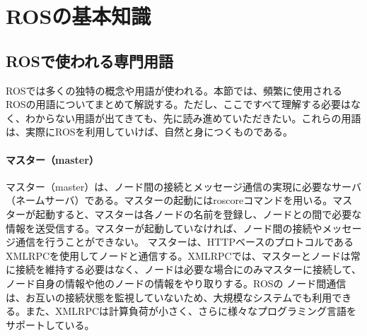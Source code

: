 
\chapter{ROSの基本知識}

\section{ROSで使われる専門用語}

ROSでは多くの独特の概念や用語が使われる。本節では、頻繁に使用されるROSの用語についてまとめて解説する。ただし、ここですべて理解する必要はなく、わからない用語が出てきても、先に読み進めていただきたい。これらの用語は、実際にROSを利用していけば、自然と身につくものである。

\subsubsection{マスター（master）}
マスター（master）は、ノード間の接続とメッセージ通信の実現に必要なサーバ（ネームサーバ）である。マスターの起動にはroscoreコマンドを用いる。マスターが起動すると、マスターは各ノードの名前を登録し、ノードとの間で必要な情報を送受信する。マスターが起動していなければ、ノード間の接続やメッセージ通信を行うことができない。
マスターは、HTTPベースのプロトコルであるXMLRPCを使用してノードと通信する。XMLRPCでは、マスターとノードは常に接続を維持する必要はなく、ノードは必要な場合にのみマスターに接続して、ノード自身の情報や他のノードの情報をやり取りする。ROSの ノード間通信は、お互いの接続状態を監視していないため、大規模なシステムでも利用できる。また、XMLRPCは計算負荷が小さく、さらに様々なプログラミング言語をサポートしている。


